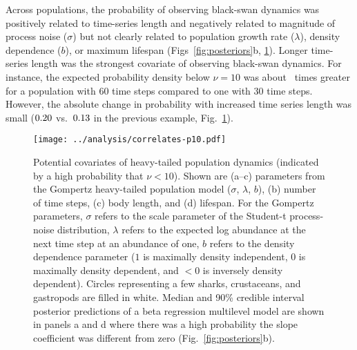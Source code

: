 Across populations, the probability of observing black-swan dynamics was
positively related to time-series length and negatively related to magnitude
of process noise ($\sigma$) but not clearly related to population growth rate
($\lambda$), density dependence ($b$), or maximum lifespan
(Figs~\ref{fig:posteriors}b, \ref{fig:correlates}). Longer time-series length
was the strongest covariate of observing black-swan dynamics. For instance,
the expected probability density below $\nu = 10$ was about \pIncHeavyNThirtyNSixty~times
greater for a population with 60 time steps compared
to one with 30 time steps. However, the absolute change in probability with
increased time series length was small ($0.20$ vs.\ $0.13$
in the previous example, Fig.~\ref{fig:correlates}).

\begin{figure}[htbp]
\begin{center}
\texttt{[image: ../analysis/correlates-p10.pdf]}

\caption[Potential covariates of heavy-tailed population dynamics.]{Potential covariates of heavy-tailed population dynamics (indicated
  by a high probability that $\nu < 10$). Shown are (a--c) parameters from the
  Gompertz heavy-tailed population model ($\sigma$, $\lambda$, $b$), (b)
  number of time steps, (c) body length, and (d) lifespan. For the Gompertz
  parameters, $\sigma$ refers to the scale parameter of the Student-t
  process-noise distribution, $\lambda$ refers to the expected log abundance
  at the next time step at an abundance of one, $b$ refers to the density
  dependence parameter ($1$ is maximally density independent, $0$ is maximally
  density dependent, and $<0$ is inversely density dependent). Circles
  representing a few sharks, crustaceans, and gastropods are filled in white.
  Median and 90\% credible interval posterior predictions of a beta regression
  multilevel model are shown in panels a and d where there was a high
  probability the slope coefficient was different from zero
  (Fig.~\ref{fig:posteriors}b).}

\label{fig:correlates}
\end{center}
\end{figure}






